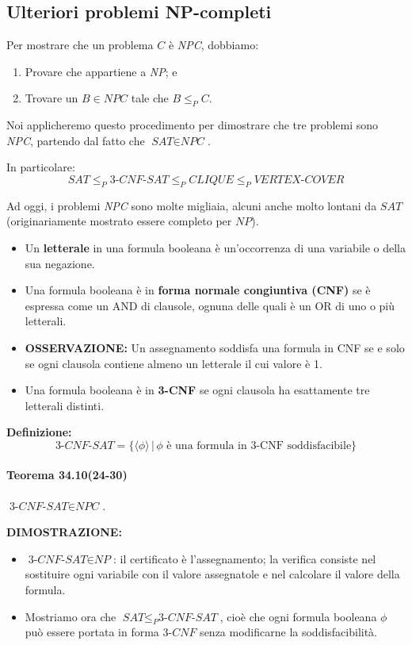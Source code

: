 \documentclass{article}
\begin{document}
\newpage
\subsection{Ulteriori problemi NP-completi}
Per mostrare che un problema $C$ è \textit{NPC}, dobbiamo:
\begin{enumerate}
    \item Provare che appartiene a \textit{NP}; e
    \item Trovare un $B \in \textit{NPC}$ tale che $B \leq_P C$.
\end{enumerate}

Noi applicheremo questo procedimento per dimostrare che tre problemi sono \textit{NPC}, partendo dal fatto che $\textit{SAT} \in \textit{NPC}$.

In particolare:
\[
\textit{SAT} \leq_P \textit{3-CNF-SAT} \leq_P \textit{CLIQUE} \leq_P \textit{VERTEX-COVER}
\]

Ad oggi, i problemi \textit{NPC} sono molte migliaia, alcuni anche molto lontani da $\textit{SAT}$ (originariamente mostrato essere completo per $\textit{NP}$).

\begin{itemize}
    \item Un \textbf{letterale} in una formula booleana è un’occorrenza di una variabile o della sua negazione.
    \item Una formula booleana è in \textbf{forma normale congiuntiva (CNF)} se è espressa come un AND di clausole, ognuna delle quali è un OR di uno o più letterali.
    \item \textbf{OSSERVAZIONE:} Un assegnamento soddisfa una formula in CNF se e solo se ogni clausola contiene almeno un letterale il cui valore è 1.
    \item Una formula booleana è in \textbf{3-CNF} se ogni clausola ha esattamente tre letterali distinti.
\end{itemize}

\textbf{Definizione:} 
\[
\textit{3-CNF-SAT} = \{\langle \phi \rangle \,|\, \phi \text{ è una formula in 3-CNF soddisfacibile} \}
\]

\paragraph{Teorema 34.10(24-30)}
\label{teorema-34.10}
\vspace{1em}
\text{}
\newline
$\textit{3-CNF-SAT} \in \textit{NPC}$.

\text{}
\newline
\textbf{DIMOSTRAZIONE:}
\begin{itemize}
    \item $\textit{3-CNF-SAT} \in \textit{NP}$: il certificato è l’assegnamento; la verifica consiste nel sostituire ogni variabile con il valore assegnatole e nel calcolare il valore della formula.
    \item Mostriamo ora che $\textit{SAT} \leq_P \textit{3-CNF-SAT}$, cioè che ogni formula booleana $\phi$ può essere portata in forma 3-$CNF$ senza modificarne la soddisfacibilità.
\end{itemize}
\end{document}
